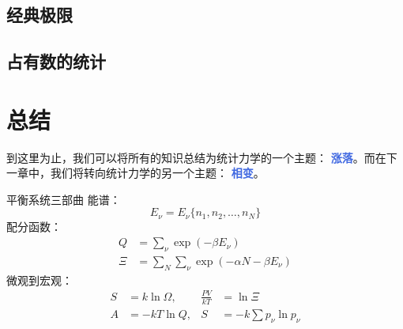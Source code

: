 \subsection{经典极限}

\subsection{占有数的统计}

\section{总结}

到这里为止，我们可以将所有的知识总结为统计力学的一个主题： \textcolor{RoyalBlue}{\textbf{\kaishu 涨落}}。而在下一章中，我们将转向统计力学的另一个主题： \textcolor{RoyalBlue}{\textbf{\kaishu 相变}}。

\begin{understanding}{\kaishu 平衡系统三部曲}
\kaishu \fontsize{11pt}{16pt}
    能谱：
    \[
        E_\nu = E_\nu\{n_1,n_2,\ldots,n_N\}
    \]
    配分函数：
    \begin{align*}
        Q &= \sum_\nu \exp(-\beta E_\nu)\\
        \Xi &= \sum_{N}\sum_{\nu} \exp(-\alpha N-\beta E_\nu)
    \end{align*}
    微观到宏观：
    \begin{align*}
        S &= k \ln \Omega,& \frac{PV}{kT} &= \ln \Xi\\
        A &= -kT\ln Q,& S &= -k\sum p_\nu \ln p_\nu
    \end{align*}
\end{understanding}